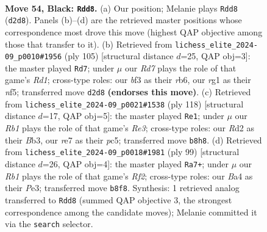 \documentclass[11pt]{article}
\begin{document}
\clearpage

\begin{figure}[p]\centering
\begin{subfigure}{0.46\textwidth}\centering
\resizebox{\linewidth}{!}{%
\newchessgame
\chessboard[
  setfen={1r6/4R3/pp5k/8/bP6/P4B1K/3r4/6R1 b - - 11 54},
  showmover=false,
  pgfstyle=straightmove, color=movearrow, markmove={d2-d8}
]}
\caption{}
\end{subfigure}\hfill
\begin{subfigure}{0.46\textwidth}\centering
\resizebox{\linewidth}{!}{%
\newchessgame
\chessboard[
  setfen={3r1k2/8/1R6/5N1B/b3p3/8/5PP1/4K3 b - - 0 53},
  showmover=false,
  pgfstyle=straightmove, color=movearrow, markmove={d8-d7}
]}
\caption{}
\end{subfigure}
\\[4pt]
\begin{subfigure}{0.46\textwidth}\centering
\resizebox{\linewidth}{!}{%
\newchessgame
\chessboard[
  setfen={3r4/7k/6p1/2p4p/8/1B2R1PP/5r2/7K w - - 0 60},
  showmover=false,
  pgfstyle=straightmove, color=movearrow, markmove={e3-e1}
]}
\caption{}
\end{subfigure}\hfill
\begin{subfigure}{0.46\textwidth}\centering
\resizebox{\linewidth}{!}{%
\newchessgame
\chessboard[
  setfen={8/5r1p/6p1/K5P1/8/4p1k1/2R1B3/1r6 b - - 2 50},
  showmover=false,
  pgfstyle=straightmove, color=movearrow, markmove={f7-a7}
]}
\caption{}
\end{subfigure}
\caption{\textbf{Move 54, Black: \texttt{Rdd8}.} (a) Our position; Melanie plays \texttt{Rdd8} (\texttt{d2d8}). Panels (b)--(d) are the retrieved master positions whose correspondence most drove this move (highest QAP objective among those that transfer to it). (b) Retrieved from \texttt{lichess\_elite\_2024-09\_p0010\#1956} (ply 105) [structural distance $d$=25, QAP obj=3]: the master played \texttt{Rd7}; under $\mu$ our \emph{Rd7} plays the role of that game's \emph{Rd1}; cross-type roles: our \emph{b}f3 as their \emph{r}b6, our \emph{r}g1 as their \emph{n}f5; transferred move \texttt{d2d8} \textbf{(endorses this move)}. (c) Retrieved from \texttt{lichess\_elite\_2024-09\_p0021\#1538} (ply 118) [structural distance $d$=17, QAP obj=5]: the master played \texttt{Re1}; under $\mu$ our \emph{Rb1} plays the role of that game's \emph{Re3}; cross-type roles: our \emph{R}d2 as their \emph{B}b3, our \emph{r}e7 as their \emph{p}c5; transferred move \texttt{b8h8}. (d) Retrieved from \texttt{lichess\_elite\_2024-09\_p0018\#1981} (ply 99) [structural distance $d$=26, QAP obj=4]: the master played \texttt{Ra7+}; under $\mu$ our \emph{Rb1} plays the role of that game's \emph{Rf2}; cross-type roles: our \emph{B}a4 as their \emph{P}e3; transferred move \texttt{b8f8}. Synthesis: 1 retrieved analog transferred to \texttt{Rdd8} (summed QAP objective 3, the strongest correspondence among the candidate moves); Melanie committed it via the \texttt{search} selector.}
\label{fig:thought-m107}
\end{figure}
\end{document}
